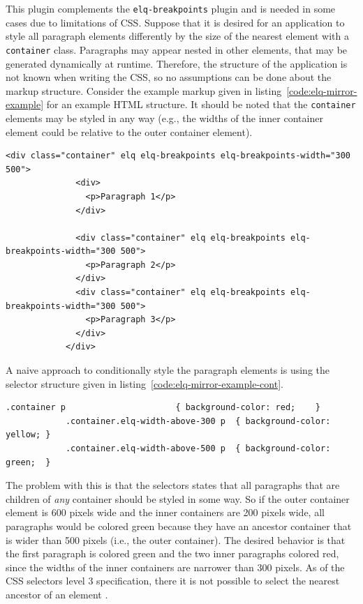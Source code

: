 \documentclass[a4paper,11pt]{kth-mag}
\newcommand{\code}[1]{\texttt{#1}}
\begin{document}
          This plugin complements the \code{elq-breakpoints} plugin and is needed in some cases due to limitations of CSS.
          Suppose that it is desired for an application to style all paragraph \glspl{element} differently by the size of the nearest element with a \code{container} class.
          Paragraphs may appear nested in other \glspl{element}, that may be generated dynamically at runtime.
          Therefore, the structure of the application is not known when writing the \gls{CSS}, so no assumptions can be done about the markup structure.
          Consider the example markup given in listing~\ref{code:elq-mirror-example} for an example \gls{HTML} structure.
          It should be noted that the \code{container} \glspl{element} may be styled in any way (e.g., the widths of the inner container \gls{element} could be relative to the outer container \gls{element}).
          \begin{lstlisting}[gobble=12,caption={Example \gls{HTML} structure where all paragraphs are desired to be conditionally styled by the nearest ancestor container.},captionpos=b,label={code:elq-mirror-example}]
            <div class="container" elq elq-breakpoints elq-breakpoints-width="300 500">
              <div>
                <p>Paragraph 1</p>
              </div>

              <div class="container" elq elq-breakpoints elq-breakpoints-width="300 500">
                <p>Paragraph 2</p>
              </div>
              <div class="container" elq elq-breakpoints elq-breakpoints-width="300 500">
                <p>Paragraph 3</p>
              </div>
            </div>
          \end{lstlisting}
          A naive approach to conditionally style the paragraph \glspl{element} is using the selector structure given in listing~\ref{code:elq-mirror-example-cont}.
          \begin{lstlisting}[gobble=12,caption={A naive approach to conditionally style the paragraph \glspl{element} by the size of the nearest ancestor container \gls{element}.},captionpos=b,label={code:elq-mirror-example-cont}]
            .container p                      { background-color: red;    }
            .container.elq-width-above-300 p  { background-color: yellow; }
            .container.elq-width-above-500 p  { background-color: green;  }
          \end{lstlisting}
          The problem with this is that the selectors states that all paragraphs that are children of \emph{any} container should be styled in some way.
          So if the outer container element is 600 pixels wide and the inner containers are 200 pixels wide, all paragraphs would be colored green because they have an ancestor container that is wider than 500 pixels (i.e., the outer container).
          The desired behavior is that the first paragraph is colored green and the two inner paragraphs colored red, since the widths of the inner containers are narrower than 300 pixels.
          As of the \gls{CSS} selectors level 3 specification, there it is not possible to select the nearest ancestor of an element \cite{w3c_css_selectors}.
          
\end{document}

